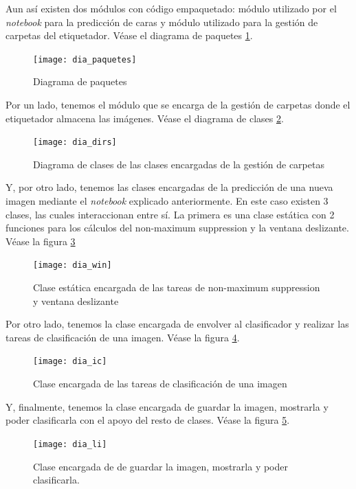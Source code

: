 Aun así existen dos módulos con código empaquetado: módulo utilizado por el \textit{notebook} para la predicción de caras y módulo utilizado para la gestión de carpetas del etiquetador. Véase el diagrama de paquetes \ref{fig:C.4.1}.

\begin{figure}[h]
\centering
\texttt{[image: dia\_paquetes]}
\caption{Diagrama de paquetes}
\label{fig:C.4.1}
\end{figure}

Por un lado, tenemos el módulo que se encarga de la gestión de carpetas donde el etiquetador almacena las imágenes. Véase el diagrama de clases \ref{fig:C.4.2}.

\begin{figure}[h]
\centering
\texttt{[image: dia\_dirs]}
\caption{Diagrama de clases de las clases encargadas de la gestión de carpetas}
\label{fig:C.4.2}
\end{figure}


Y, por otro lado, tenemos las clases encargadas de la predicción de una nueva imagen mediante el \textit{notebook} explicado anteriormente. En este caso existen 3 clases, las cuales interaccionan entre sí. La primera es una clase estática con 2 funciones para los cálculos del non-maximum suppression y la ventana deslizante. Véase la figura \ref{fig:C.4.3} 


\begin{figure}[h]
\centering
\texttt{[image: dia\_win]}
\caption{Clase estática encargada de las tareas de non-maximum suppression y ventana deslizante}
\label{fig:C.4.3}
\end{figure}

Por otro lado, tenemos la clase encargada de envolver al clasificador y realizar las tareas de clasificación de una imagen. Véase la figura \ref{fig:C.4.4}.

\begin{figure}[h]
\centering
\texttt{[image: dia\_ic]}
\caption{Clase encargada de las tareas de clasificación de una imagen}
\label{fig:C.4.4}
\end{figure}

Y, finalmente, tenemos la clase encargada de guardar la imagen, mostrarla y poder clasificarla con el apoyo del resto de clases. Véase la figura \ref{fig:C.4.5}.

\begin{figure}[h]
\centering
\texttt{[image: dia\_li]}
\caption{Clase encargada de de guardar la imagen, mostrarla y poder clasificarla.}
\label{fig:C.4.5}
\end{figure}

